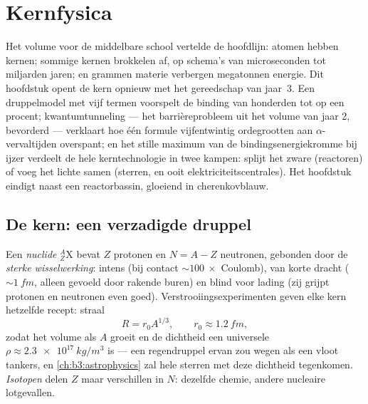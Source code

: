 \chapter{Kernfysica}\label{ch:b3:nuclear-physics}


Het volume voor de middelbare school vertelde de hoofdlijn: atomen hebben kernen;
sommige kernen brokkelen af, op schema's van microseconden tot
miljarden jaren; en grammen materie verbergen megatonnen energie. Dit
hoofdstuk opent de kern opnieuw met het gereedschap van jaar~3. Een druppelmodel met
vijf termen voorspelt de binding van honderden  tot op een
procent; kwantumtunneling --- het barrièreprobleem uit het volume van jaar 2,
bevorderd --- verklaart hoe één formule vijfentwintig ordegrootten
aan $\alpha$-vervaltijden overspant; en het stille maximum van de
bindingsenergiekromme bij ijzer verdeelt de hele kerntechnologie in twee
kampen: splijt het zware (reactoren) of voeg het lichte samen (sterren, en
ooit elektriciteitscentrales). Het hoofdstuk eindigt naast een reactorbassin,
gloeiend in cherenkovblauw.

\section{De kern: een verzadigde druppel}

\begin{definition}\label{def:b3:nuclear-physics:nuclide}
Een \emph{nuclide} $^{A}_{Z}\text{X}$ bevat $Z$ protonen en $N = A -
Z$ neutronen, gebonden door de \emph{sterke wisselwerking}: intens
(bij contact ${\sim}\qty{100}{}\times$ Coulomb), van korte dracht
(${\sim}\qty{1}{fm}$, alleen gevoeld door rakende buren) en blind
voor lading (zij grijpt protonen en neutronen even goed). Verstrooiings\-experimenten
geven elke kern hetzelfde recept: straal
\[
R = r_0A^{1/3} , \qquad r_0 \approx \qty{1.2}{fm} ,
\]
zodat het volume als $A$ groeit en de dichtheid een universele
$\rho \approx \qty{2.3e17}{kg/m^3}$ is --- een regendruppel ervan zou
wegen als een vloot tankers, en
\cref{ch:b3:astrophysics} zal hele sterren met deze dichtheid tegenkomen.
\emph{Isotopen} delen $Z$ maar verschillen in $N$: dezelfde chemie,
andere nucleaire lotgevallen.
\end{definition}

